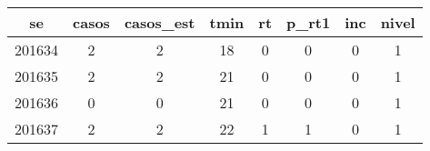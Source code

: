 \begin{tabular}{c|ccccccc}
  \hline
se & casos & casos\_est & tmin & rt & p\_rt1 & inc & nivel \\ 
  \hline
201634 & 2 & 2 & 18 & 0 & 0 & 0 & 1 \\ 
  201635 & 2 & 2 & 21 & 0 & 0 & 0 & 1 \\ 
  201636 & 0 & 0 & 21 & 0 & 0 & 0 & 1 \\ 
  201637 & 2 & 2 & 22 & 1 & 1 & 0 & 1 \\ 
   \hline
\end{tabular}
